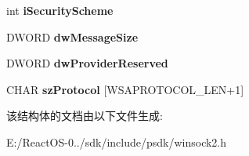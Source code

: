 \begin{DoxyCompactItemize}
int {\bfseries i\+Security\+Scheme}
\item 
\mbox{\label{struct___w_s_a_p_r_o_t_o_c_o_l___i_n_f_o_a_abb0823feffa5e440c28426dcf8cf2200}} 
D\+W\+O\+RD {\bfseries dw\+Message\+Size}
\item 
\mbox{\label{struct___w_s_a_p_r_o_t_o_c_o_l___i_n_f_o_a_ac8affea52539c644a1a428e8e84ef257}} 
D\+W\+O\+RD {\bfseries dw\+Provider\+Reserved}
\item 
\mbox{\label{struct___w_s_a_p_r_o_t_o_c_o_l___i_n_f_o_a_af2522feec7f954d9f4b504a3ed3327a0}} 
C\+H\+AR {\bfseries sz\+Protocol} \mbox{[}W\+S\+A\+P\+R\+O\+T\+O\+C\+O\+L\+\_\+\+L\+EN+1\mbox{]}
\end{DoxyCompactItemize}


该结构体的文档由以下文件生成\+:\begin{DoxyCompactItemize}
\item 
E\+:/\+React\+O\+S-\/0../sdk/include/psdk/winsock2.\+h\end{DoxyCompactItemize}
